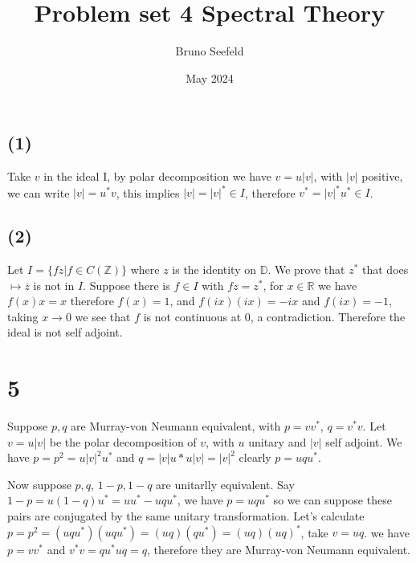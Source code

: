 \documentclass{article}
\title{Problem set 4 Spectral Theory}
\author{Bruno Seefeld}
\date{May 2024}
\begin{document}
\maketitle





\section{}
\subsection*{(1)}
Take $v$ in the ideal I, by polar decomposition we have $v=u|v|$, with $|v|$ positive, we can write $|v|=u^* v$, this implies $|v|=|v|^\ast \in I$, therefore 
$v^\ast=|v|^\ast u^*\in I$.

\subsection*{(2)}

Let $I=\{fz|f\in C(\mathbb{Z})\}$ where $z$ is the identity on $\mathbb{D}$. We prove that $z^\ast$ that does $\mapsto \overline{z}$ is not in $I$. Suppose 
there is $f\in I$ with $fz=z^\ast$, for $x\in \mathbb{R}$ we have $f(x)x=x$ therefore $f(x)=1$, and $f(ix)(ix)=-ix$ and $f(ix)=-1$, taking $x\to 0$ we see that $f$ is 
not continuous at $0$, a contradiction. Therefore the ideal is not self adjoint.  



\section{}


\section*{5}

 \quad\quad   Suppose $p,q$ are Murray-von Neumann equivalent, with $p=vv^\ast$, $q=v^\ast v$. Let $v=u|v|$ be the polar
decomposition of $v$, with $u$ unitary and $|v|$ self adjoint. We have $p=p^2=u|v|^2u^\ast$ 
and $q=|v|u\ast u |v|=|v|^2$
clearly $p=uqu^\ast$.

Now suppose $p,q$, $1-p,1-q$ are unitarlly equivalent. Say $1-p=u(1-q)u^\ast=uu^\ast -uqu^\ast$, we have
$p=uqu^\ast$ so we can suppose these pairs are conjugated by the same unitary transformation. 
Let's calculate $p=p^2=(uqu^\ast)(uqu^\ast)=(uq)(qu^\ast)=(uq)(uq)^\ast $, take $v=uq$. we have $p=vv^\ast$
and $v^\ast v= qu^\ast u q=q$, therefore they are Murray-von Neumann equivalent.
\end{document}
